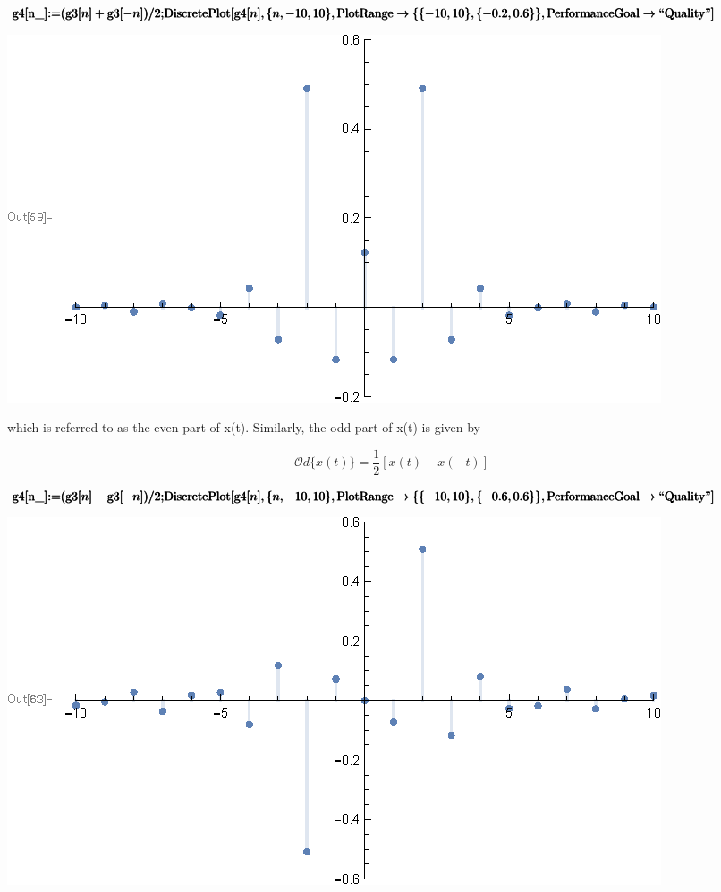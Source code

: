 \documentclass{report}
\begin{document}
\begin{doublespace}
\noindent\(\pmb{\text{g4}[\text{n$\_$}]\text{:=}(\text{g3}[n]+\text{g3}[-n])/2;}\\
\pmb{\text{DiscretePlot}[\text{g4}[n], \{n, -10,10\},\text{PlotRange}\to \{\{-10,10\},\{-0.2,0.6\}\},\text{PerformanceGoal}\to \text{{``}Quality{''}}]}\)
\end{doublespace}

\includegraphics{GhassaneAniba_Signals_Systems_Oppenheim_Chap1_gr14.eps}

which is referred to as the even part of x(t). Similarly, the odd part of x(t) is given by

\begin{equation}
\mathcal{O}\mathit{d}\{x(t)\}=\frac{1}{2}[x(t)-x(-t)]
\end{equation}

\begin{doublespace}
\noindent\(\pmb{\text{g4}[\text{n$\_$}]\text{:=}(\text{g3}[n]-\text{g3}[-n])/2;}\\
\pmb{\text{DiscretePlot}[\text{g4}[n], \{n, -10,10\},\text{PlotRange}\to \{\{-10,10\},\{-0.6,0.6\}\},\text{PerformanceGoal}\to \text{{``}Quality{''}}]}\)
\end{doublespace}

\includegraphics{GhassaneAniba_Signals_Systems_Oppenheim_Chap1_gr15.eps}
\end{document}
